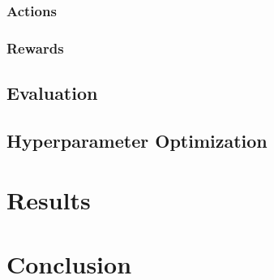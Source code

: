 \documentclass{article}
\begin{document}
\subsubsection{\normalsize{Actions}}

\subsubsection{\normalsize{Rewards}}

\subsection{\normalsize{Evaluation}}

\subsection{\normalsize{Hyperparameter Optimization}}

\section{\large{Results}}

\section{\large{Conclusion}}



%

%
\end{document}
